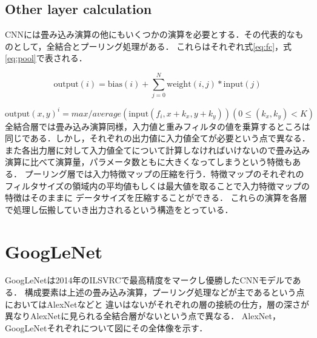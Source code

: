 {\subsection{Other layer calculation}
\label{sec:other_calc}
CNNには畳み込み演算の他にもいくつかの演算を必要とする．その代表的なものとして，全結合とプーリング処理がある．
これらはそれぞれ式\ref{eq:fc}，式\ref{eq:pool}で表される．

\begin{equation}
  \label{eq:fc}
  \mathrm{output}(i) = \mathrm{bias}(i) + \sum_{j=0}^{N} \mathrm{weight}(i, j) * \mathrm{input}(j)
\end{equation}

\begin{equation}
  \label{eq:pool}
	\mathrm{output}(x, y)^{i} = max / average(\mathrm{input}(f_i,x + k_x, y + k_y))   (0 \leq (k_x, k_y) < K)
\end{equation}
全結合層では畳み込み演算同様，入力値と重みフィルタの値を乗算するところは同じである．しかし，それぞれの出力値に入力値全てが必要という点で異なる．
また各出力層に対して入力値全てについて計算しなければいけないので畳み込み演算に比べて演算量，パラメータ数ともに大きくなってしまうという特徴もある．
プーリング層では入力特徴マップの圧縮を行う．特徴マップのそれぞれのフィルタサイズの領域内の平均値もしくは最大値を取ることで入力特徴マップの特徴はそのままに
データサイズを圧縮することができる．
これらの演算を各層で処理し伝搬していき出力されるという構造をとっている．

\section{GoogLeNet}
\label{sec:googlenet}
GoogLeNetは2014年のILSVRCで最高精度をマークし優勝したCNNモデルである．
構成要素は上述の畳み込み演算，プーリング処理などが主であるという点においてはAlexNetなどと
違いはないがそれぞれの層の接続の仕方，層の深さが異なりAlexNetに見られる全結合層がないという点で異なる．
AlexNet， GoogLeNetそれぞれについて図にその全体像を示す．


}
